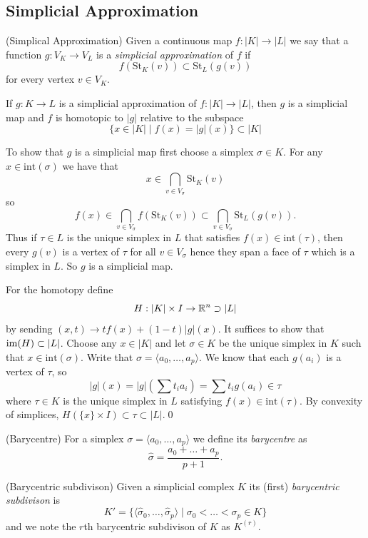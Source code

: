 \documentclass{article}
\begin{document}
\subsection{Simplicial Approximation}
\begin{definition}
	(Simplical Approximation) Given a continuous map $ f:|K|\to |L| $ we say that a function $ g:V_K\to V_L$ is a \textit{simplicial approximation} of $ f $ if
	\[
		f(\mathrm{St}_K(v)) \subset \mathrm{St}_L(g(v))
	\]
	for every vertex $ v\in V_K $.
\end{definition}
\begin{lemma}
  If $ g:K\to L $ is a simplicial approximation of $ f:|K|\to |L| $, then $ g $ is a simplicial map and $ f $ is homotopic to $ |g| $ relative to the subspace
  \[
	  \{x\in |K| \mid f(x) = |g|(x)\} \subset |K|
  \]
\end{lemma}
\pf To show that $ g $ is a simplicial map first choose a simplex $ \sigma\in K $. For any $ x\in\mathrm{int}(\sigma) $ we have that 
\[
	x\in \bigcap_{v\in V_\sigma} \mathrm{St}_K(v)
\]
so 
\[
	f(x) \in \bigcap_{v\in V_\sigma}f(\mathrm{St}_K(v)) \subset \bigcap_{v\in V_\sigma} \mathrm{St}_L(g(v)).
\]
Thus if $ \tau\in L $ is the unique simplex in $ L $ that satisfies $ f(x) \in \mathrm{int}(\tau) $, then every $ g(v) $ is a vertex of $ \tau $ for all $ v\in V_\sigma $ hence they span a face of $ \tau $ which is a simplex in $ L $. So $ g $ is a simplicial map. \par
For the homotopy define 
\[
  H: |K|\times I \to \mathbb{R}^n \supset |L|
\]
by sending $ (x,t) \to tf(x) + (1-t)|g|(x) $. It suffices to show that $ \operatorname{im}(H) \subset |L| $. Choose any $ x\in |K| $ and let $ \sigma\in K $ be the unique simplex in $ K $ such that $ x\in \mathrm{int}(\sigma) $. Write that $ \sigma = \langle a_0,\dots, a_p\rangle $. We know that each $ g(a_i) $ is a vertex of $ \tau $, so
\[
  |g|(x) = |g|\left(\sum t_ia_i\right) = \sum t_ig(a_i)\in \tau
\]
where $ \tau\in K $ is the unique simplex in $ L $ satisfying $ f(x)\in \mathrm{int}(\tau) $. By convexity of simplices, $ H(\{x\}\times I) \subset \tau \subset |L| $.\qed
\begin{definition}
	(Barycentre) For a simplex $ \sigma = \langle a_0,\dots, a_p\rangle $ we define its \textit{barycentre} as 
	\[
		\hat\sigma = \frac{a_0+\dots +a_p}{p+1}.
	\]
\end{definition}
\begin{definition}
	(Barycentric subdivison) Given a simplicial complex $ K $ its (first) \textit{barycentric subdivison} is
	\[
		K' = \{\langle\hat\sigma_0, \dots, \hat\sigma_p\rangle\mid \sigma_0<\dots<\sigma_p\in K\}
	\]
	and we note the $ r $th barycentric subdivison of $ K $ as $ K^{(r)} $.
\end{definition}
\end{document}
